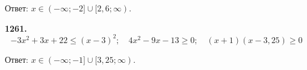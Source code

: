 \null \hspace*{\fill} Ответ: $x\in(-\infty;-2]\cup[2,6;\infty)$. 

\textbf{1261.} $$-3x^2+3x+22\leq(x-3)^2;\quad 4x^2-9x-13\geq0;\quad(x+1)(x-3,25)\geq0$$

\begin{figure}[h!]
\end{figure}

\null \hspace*{\fill} Ответ: $x\in(-\infty;-1]\cup[3,25;\infty)$. 